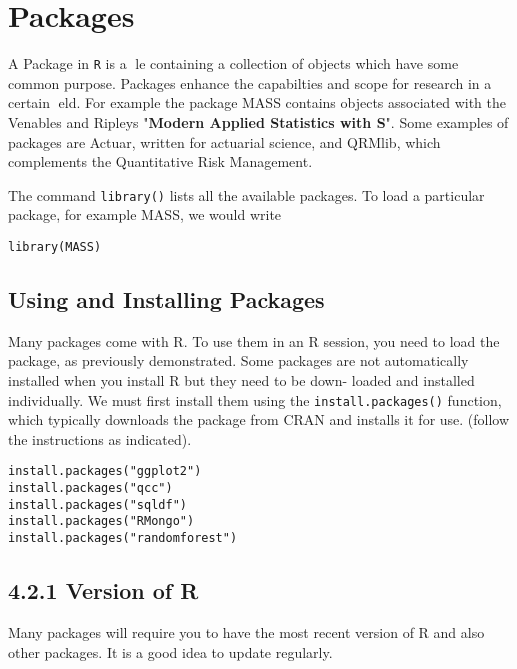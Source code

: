 \section{ Packages }

A Package in \texttt{R} is a le containing a collection of objects which have some common purpose.
Packages enhance the capabilties and scope for research in a certain eld. For example the
package MASS contains objects associated with the Venables and Ripleys "\textbf{Modern Applied
Statistics with S}". Some examples of packages are Actuar, written for actuarial science, and
QRMlib, which complements the Quantitative Risk Management.

The command \texttt{library()}
lists all the available packages. To load a particular package, for example MASS, we would
write
\begin{framed}
\begin{verbatim}
library(MASS)
\end{verbatim}
\end{framed}
\subsection{ Using and Installing Packages }
Many packages come with R. To use them in an R session, you need to load the package, as
previously demonstrated.
Some packages are not automatically installed when you install R but they need to be down-
loaded and installed individually. We must first install them using the \texttt{install.packages()}
function, which typically downloads the package from CRAN and installs it for use. (follow the
instructions as indicated).
\begin{framed}
\begin{verbatim}
install.packages("ggplot2")
install.packages("qcc")
install.packages("sqldf")
install.packages("RMongo")
install.packages("randomforest")
\end{verbatim}
\end{framed}
\subsection{ 4.2.1 Version of R }
Many packages will require you to have the most recent version of R and also other packages.
It is a good idea to update regularly.
 
